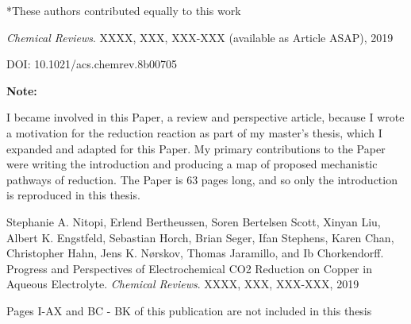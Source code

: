 \begin{appendices}
		*These authors contributed equally to this work
		
		\textit{Chemical Reviews}. XXXX, XXX, XXX-XXX (available as Article ASAP), 2019
		
		DOI: 10.1021/acs.chemrev.8b00705
		
		\vspace{2cm}
		
		\textbf{Note:}
		
		I became involved in this Paper, a review and perspective article, because I wrote a motivation for the  reduction reaction as part of my master's thesis, which I expanded and adapted for this Paper. My primary contributions to the Paper were writing the introduction and producing a map of proposed mechanistic pathways of  reduction. The Paper is 63 pages long, and so only the introduction is reproduced in this thesis.	
		
		
		
		\clearpage
		\vspace{5cm}
		
		
		{
			\hspace{0pt}
			\vfill
			Stephanie A. Nitopi, Erlend Bertheussen, Soren Bertelsen Scott, Xinyan Liu, Albert K. Engstfeld, Sebastian Horch, Brian Seger, Ifan Stephens, Karen Chan, Christopher Hahn, Jens K. Nørskov, Thomas Jaramillo, and Ib Chorkendorff. Progress and Perspectives of Electrochemical CO2 Reduction on Copper in Aqueous Electrolyte. \textit{Chemical Reviews}. XXXX, XXX, XXX-XXX, 2019
			
			\vspace{1cm}
			
			\centering\Large
			Pages I-AX and BC - BK of this publication are not included in this thesis
			\vfill
			\hspace{0pt}
		}
		\clearpage
		
		
		
		


\end{appendices}
